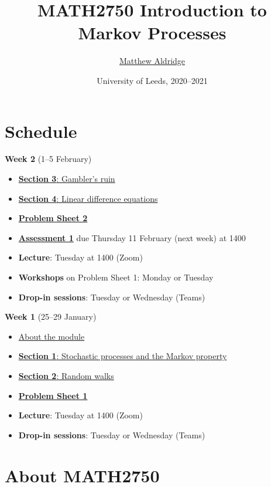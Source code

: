 \documentclass[
  a4paper,
]{article}
\title{MATH2750 Introduction to Markov Processes}
\author{\href{mailto:m.aldridge@leeds.ac.uk}{Matthew Aldridge}}
\date{University of Leeds, 2020--2021}
\providecommand{\tightlist}{%
  \setlength{\itemsep}{0pt}\setlength{\parskip}{0pt}}
\theoremstyle{definition}
\theoremstyle{definition}
\theoremstyle{definition}
\theoremstyle{remark}
\begin{document}
\maketitle

{
\setcounter{tocdepth}{2}
\tableofcontents
}
\hypertarget{home}{%
\section*{Schedule}\label{home}}

\textbf{Week 2} (1--5 February)

\begin{itemize}
\tightlist
\item
  \protect\hyperlink{S03-gamblers-ruin}{\textbf{Section 3}: Gambler's ruin}
\item
  \protect\hyperlink{S04-ldes}{\textbf{Section 4}: Linear difference equations}
\item
  \protect\hyperlink{P01}{\textbf{Problem Sheet 2}}
\item
  \protect\hyperlink{A1}{\textbf{Assessment 1}} due Thursday 11 February (next week) at 1400
\item
  \textbf{Lecture}: Tuesday at 1400 (Zoom)
\item
  \textbf{Workshops} on Problem Sheet 1: Monday or Tuesday
\item
  \textbf{Drop-in sessions}: Tuesday or Wednesday (Teams)
\end{itemize}

\textbf{Week 1} (25--29 January)

\begin{itemize}
\tightlist
\item
  \protect\hyperlink{S00-about}{About the module}
\item
  \protect\hyperlink{S01-stochastic-processes}{\textbf{Section 1}: Stochastic processes and the Markov property}
\item
  \protect\hyperlink{S02-random-walk}{\textbf{Section 2}: Random walks}
\item
  \protect\hyperlink{P01}{\textbf{Problem Sheet 1}}
\item
  \textbf{Lecture}: Tuesday at 1400 (Zoom)
\item
  \textbf{Drop-in sessions}: Tuesday or Wednesday (Teams)
\end{itemize}

\hypertarget{S00-about}{%
\section*{About MATH2750}\label{S00-about}}
\end{document}
